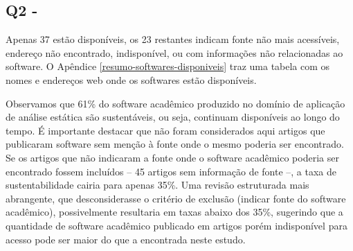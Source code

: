 \subsection{Q2 - \EstudoDoisQuestaoDois}


Apenas 37 estão disponíveis, os 23 restantes indicam fonte não mais
acessíveis, endereço não encontrado, indisponível, ou com informações não
relacionadas ao software. 
O Apêndice \ref{resumo-softwares-disponiveis} traz
uma tabela com os nomes e endereços web onde os softwares estão disponíveis.

Observamos que 61\% do software acadêmico produzido no domínio de aplicação de análise estática 
são sustentáveis, ou seja, continuam disponíveis ao longo do tempo. 
É importante destacar que não foram considerados aqui artigos que publicaram software 
sem menção à fonte onde o mesmo poderia ser encontrado.
Se os artigos que não indicaram a fonte onde o software acadêmico poderia ser encontrado
fossem incluídos -- 45 artigos sem informação de fonte --, 
a taxa de sustentabilidade cairia para apenas 35\%.
Uma revisão estruturada mais abrangente, que desconsiderasse o critério de exclusão
(indicar fonte do software acadêmico), possivelmente resultaria em taxas abaixo dos 35\%, 
sugerindo que a quantidade de software acadêmico publicado em artigos porém indisponível para acesso
pode ser maior do que a encontrada neste estudo.


